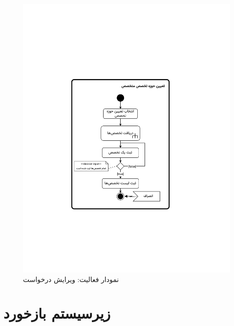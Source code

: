 \begin{figure}
	\centering
	\includegraphics[scale=0.8, page=5]{figs/OOD-activity21-30.pdf}
	\caption{نمودار فعالیت: ویرایش درخواست}
\end{figure}
\FloatBarrier
\newpage


\section{زیرسیستم بازخورد}


